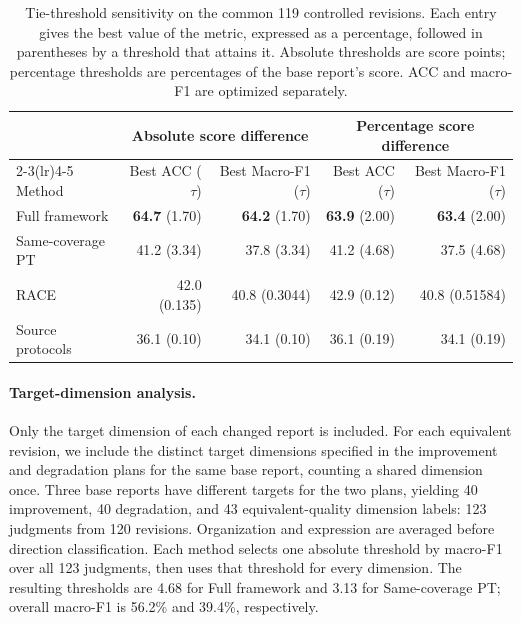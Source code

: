 \documentclass{article}
\begin{document}
\begin{table}[t]
\centering\small\setlength{\tabcolsep}{5pt}
\begin{tabular}{@{}lrrrr@{}}
\toprule
& \multicolumn{2}{c}{Absolute score difference} & \multicolumn{2}{c}{Percentage score difference} \\
\cmidrule(lr){2-3}\cmidrule(lr){4-5}
Method & Best ACC ($\tau$) & Best Macro-F1 ($\tau$) & Best ACC ($\tau$) & Best Macro-F1 ($\tau$) \\
\midrule
Full framework & \textbf{64.7} (1.70) & \textbf{64.2} (1.70) & \textbf{63.9} (2.00) & \textbf{63.4} (2.00) \\
Same-coverage PT & 41.2 (3.34) & 37.8 (3.34) & 41.2 (4.68) & 37.5 (4.68) \\
RACE & 42.0 (0.135) & 40.8 (0.3044) & 42.9 (0.12) & 40.8 (0.51584) \\
Source protocols & 36.1 (0.10) & 34.1 (0.10) & 36.1 (0.19) & 34.1 (0.19) \\
\bottomrule
\end{tabular}
\caption{Tie-threshold sensitivity on the common 119 controlled revisions. Each entry gives the best value of the metric, expressed as a percentage, followed in parentheses by a threshold that attains it. Absolute thresholds are score points; percentage thresholds are percentages of the base report's score. ACC and macro-F1 are optimized separately.}
\label{tab:controlled_thresholds}
\end{table}

\paragraph{Target-dimension analysis.}
Only the target dimension of each changed report is included. For each equivalent revision, we include the distinct target dimensions specified in the improvement and degradation plans for the same base report, counting a shared dimension once. Three base reports have different targets for the two plans, yielding 40 improvement, 40 degradation, and 43 equivalent-quality dimension labels: 123 judgments from 120 revisions. Organization and expression are averaged before direction classification. Each method selects one absolute threshold by macro-F1 over all 123 judgments, then uses that threshold for every dimension. The resulting thresholds are 4.68 for Full framework and 3.13 for Same-coverage PT; overall macro-F1 is 56.2\% and 39.4\%, respectively.
\end{document}
